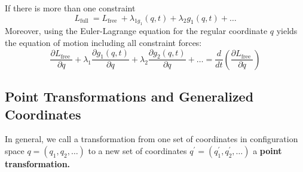 If there is more than one constraint
$$
L_{\text {full }}=L_{\text {free }}+\lambda_{1 g_{1}}(q, t)+\lambda_{2} g_{1}(q, t)+\ldots
$$
Moreover, using the Euler-Lagrange equation for the regular coordinate $q$ yields the equation of motion including all constraint forces:
$$
\frac{\partial L_{\text {free }}}{\partial q}+\lambda_{1} \frac{\partial g_{1}(q, t)}{\partial q}+\lambda_{2} \frac{\partial g_{2}(q, t)}{\partial q}+\ldots=\frac{d}{d t}\left(\frac{\partial L_{\text {free }}}{\partial \dot{q}}\right)
$$

\subsection{Point Transformations and Generalized Coordinates}
In general, we call a transformation from one set of coordinates in configuration space $q=\left(q_{1}, q_{2}, \ldots\right)$ to a new set of coordinates $q^{\prime}=\left(q_{1}^{\prime}, q_{2}^{\prime}, \ldots\right)$ a\textbf{ point transformation.}
